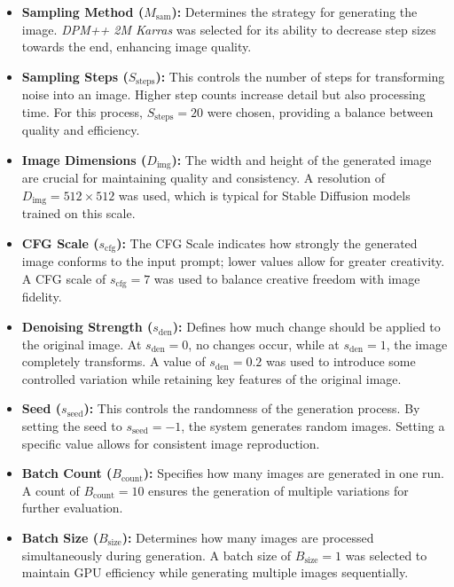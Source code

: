 \documentclass[12pt,DIV14,BCOR12mm,a4paper,footinclude=false,headinclude,parskip=half-,twoside,openright,cleardoublepage=empty,toc=index,bibliography=totoc,listof=totoc]{scrreprt}
\numberwithin{equation}{chapter}
\begin{document}
\begin{itemize}
    \item \textbf{Sampling Method (\(M_{\text{sam}}\)):} Determines the strategy for generating the image. \textit{DPM++ 2M Karras} was selected for its ability to decrease step sizes towards the end, enhancing image quality.
    
    \item \textbf{Sampling Steps (\(S_{\text{steps}}\)):} This controls the number of steps for transforming noise into an image. Higher step counts increase detail but also processing time. For this process, \(S_{\text{steps}} = 20\) were chosen, providing a balance between quality and efficiency.
    
    \item \textbf{Image Dimensions (\(D_{\text{img}}\)):} The width and height of the generated image are crucial for maintaining quality and consistency. A resolution of \(D_{\text{img}} = 512 \times 512\) was used, which is typical for Stable Diffusion models trained on this scale.
    
    \item \textbf{CFG Scale (\(s_{\text{cfg}}\)):} The CFG Scale indicates how strongly the generated image conforms to the input prompt; lower values allow for greater creativity. A CFG scale of \(s_{\text{cfg}} = 7\) was used to balance creative freedom with image fidelity.
    
    \item \textbf{Denoising Strength (\(s_{\text{den}}\)):} Defines how much change should be applied to the original image. At \(s_{\text{den}} = 0\), no changes occur, while at \(s_{\text{den}} = 1\), the image completely transforms. A value of \(s_{\text{den}} = 0.2\) was used to introduce some controlled variation while retaining key features of the original image.
    
    \item \textbf{Seed (\(s_{\text{seed}}\)):} This controls the randomness of the generation process. By setting the seed to \(s_{\text{seed}} = -1\), the system generates random images. Setting a specific value allows for consistent image reproduction.
    
    \item \textbf{Batch Count (\(B_{\text{count}}\)):} Specifies how many images are generated in one run. A count of \(B_{\text{count}} = 10\) ensures the generation of multiple variations for further evaluation.
    
    \item \textbf{Batch Size (\(B_{\text{size}}\)):} Determines how many images are processed simultaneously during generation. A batch size of \(B_{\text{size}} = 1\) was selected to maintain GPU efficiency while generating multiple images sequentially.
\end{itemize}
\end{document}
